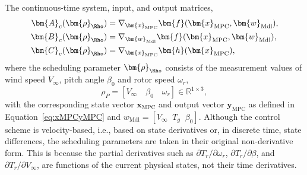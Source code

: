 The continuous-time system, input, and output matrices,
\begin{align*}
      \bm{A}_c(\bm{\rho}_{\Rho}) &= \nabla_{\bm{x}_{\text{MPC}}} \bm{f}(\bm{x}_{\text{MPC}}, \bm{w}_{\text{Mdl}}),\\ 
      \bm{B}_c(\bm{\rho}_{\Rho}) &= \nabla_{\bm{w}_{\text{Mdl}}} \bm{f}(\bm{x}_{\text{MPC}}, \bm{w}_{\text{Mdl}}),\\ 
      \bm{C}_c(\bm{\rho}_{\Rho}) &= \nabla_{\bm{x}_{\text{MPC}}} \bm{h}(\bm{x}_{\text{MPC}}),
\end{align*}
where the scheduling parameter $\bm{\rho}_{\Rho}$ consists of the measurement values of  wind speed $V_{\infty}$, pitch angle $\beta_0$ and rotor speed $\omega_r$,
\[\rho_{P} = [V_{\infty} \quad {\beta_0} \quad {\omega}_{r} ]\in \mathbb{R}^{1 \times 3}, \]  
with the corresponding state vector $\bm{x}_{\text{MPC}}$ and output vector $\bm{y}_{\text{MPC}}$ as defined in Equation~\ref{eq:xMPCyMPC} and $w_{\text{Mdl}} = [V_{\infty} \; \; T_g  \; \; \beta_0]$. Although the control scheme is velocity-based, i.e., based on state derivatives or, in discrete time, state differences, the scheduling parameters are taken in their original non-derivative form. This is because the partial derivatives such as \( \partial T_r / \partial \omega_r \), \( \partial T_r / \partial \beta \), and \( \partial T_r / \partial V_{\infty} \), are functions of the current physical states, not their time derivatives.

